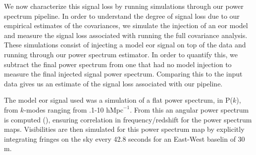 \documentclass[twocolumn,numberedappendix]{emulateapj} \shorttitle{PSA64}
\begin{document}

We now characterize this signal loss by running simulations through our power
spectrum pipeline.  In order to understand the degree of signal loss due to our
empirical estimates of the covariances, we simulate the injection of an eor
model and measure the signal loss associated with running the full covariance
analysis. These simulations consist of injecting a model eor signal on top of
the data and running through our power spectrum estimator. In order to
quantify this, we subtract the final power spectrum from one that had no model
injection to measure the final injected signal power spectrum. Comparing this to
the input data gives us an estimate of the signal loss associated with our
pipeline.

The model eor signal used was a simulation of a flat power spectrum, in P($k$),
from $k$-modes ranging from .1-10 $\text{hMpc}^{-1}$. From this an angular power
spectrum is computed (\cite{datta_et_al2007, lewis_challinor_2007}), ensuring
correlation in frequency/redshift for the power spectrum maps. Visibilities are
then simulated for this power spectrum map by explicitly integrating fringes on
the sky every 42.8 seconds for an East-West baselin of 30 m.
\end{document}
